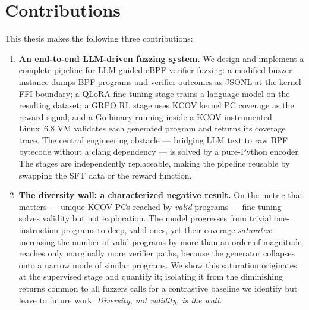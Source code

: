 \section{Contributions}
\label{sec:contributions}

This thesis makes the following three contributions:

\begin{enumerate}

  \item \textbf{An end-to-end LLM-driven fuzzing system.}
        We design and implement a complete pipeline for LLM-guided eBPF verifier
        fuzzing: a modified buzzer instance dumps BPF programs and verifier outcomes
        as JSONL at the kernel FFI boundary; a QLoRA fine-tuning stage trains a
        language model on the resulting dataset; a GRPO RL stage uses KCOV kernel
        PC coverage as the reward signal; and a Go binary running inside a
        KCOV-instrumented Linux~6.8 VM validates each generated program and
        returns its coverage trace. The central engineering obstacle --- bridging
        LLM text to raw BPF bytecode without a clang dependency --- is solved by a
        pure-Python encoder. The stages are independently replaceable, making the
        pipeline reusable by swapping the SFT data or the reward function.

  \item \textbf{The diversity wall: a characterized negative result.}
        On the metric that matters --- unique KCOV PCs reached by \emph{valid}
        programs --- fine-tuning solves validity but not exploration. The model
        progresses from trivial one-instruction programs to deep, valid ones, yet
        their coverage \emph{saturates}: increasing the number of valid programs by
        more than an order of magnitude reaches only marginally more verifier paths,
        because the generator collapses onto a narrow mode of similar programs.
        We show this saturation originates at the supervised stage and quantify it;
        isolating it from the diminishing returns common to all fuzzers calls for a
        contrastive baseline we identify but leave to future work.
        \emph{Diversity, not validity, is the wall.}


\end{enumerate}
